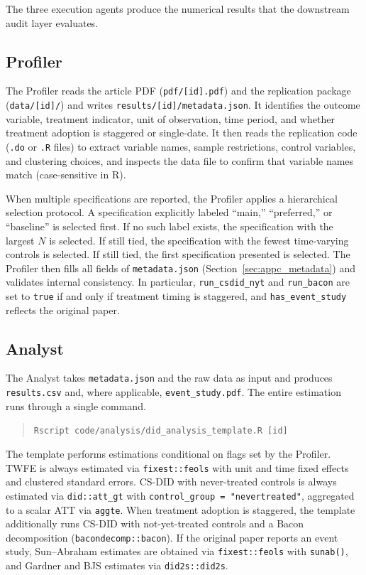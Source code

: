 The three execution agents produce the numerical results that the downstream audit layer evaluates.

\subsection*{Profiler}

The Profiler reads the article PDF (\texttt{pdf/[id].pdf}) and the replication package (\texttt{data/[id]/}) and writes \texttt{results/[id]/metadata.json}. It identifies the outcome variable, treatment indicator, unit of observation, time period, and whether treatment adoption is staggered or single-date. It then reads the replication code (\texttt{.do} or \texttt{.R} files) to extract variable names, sample restrictions, control variables, and clustering choices, and inspects the data file to confirm that variable names match (case-sensitive in R).

When multiple specifications are reported, the Profiler applies a hierarchical selection protocol. A specification explicitly labeled ``main,'' ``preferred,'' or ``baseline'' is selected first. If no such label exists, the specification with the largest $N$ is selected. If still tied, the specification with the fewest time-varying controls is selected. If still tied, the first specification presented is selected. The Profiler then fills all fields of \texttt{metadata.json} (Section~\ref{sec:appc_metadata}) and validates internal consistency. In particular, \texttt{run\_csdid\_nyt} and \texttt{run\_bacon} are set to \texttt{true} if and only if treatment timing is staggered, and \texttt{has\_event\_study} reflects the original paper.

\subsection*{Analyst}

The Analyst takes \texttt{metadata.json} and the raw data as input and produces \texttt{results.csv} and, where applicable, \texttt{event\_study.pdf}. The entire estimation runs through a single command.
\begin{quote}
\texttt{Rscript code/analysis/did\_analysis\_template.R [id]}
\end{quote}
The template performs estimations conditional on flags set by the Profiler. TWFE is always estimated via \texttt{fixest::feols} with unit and time fixed effects and clustered standard errors. CS-DID with never-treated controls is always estimated via \texttt{did::att\_gt} with \texttt{control\_group = "nevertreated"}, aggregated to a scalar ATT via \texttt{aggte}. When treatment adoption is staggered, the template additionally runs CS-DID with not-yet-treated controls and a Bacon decomposition (\texttt{bacondecomp::bacon}). If the original paper reports an event study, Sun--Abraham estimates are obtained via \texttt{fixest::feols} with \texttt{sunab()}, and Gardner and BJS estimates via \texttt{did2s::did2s}.

